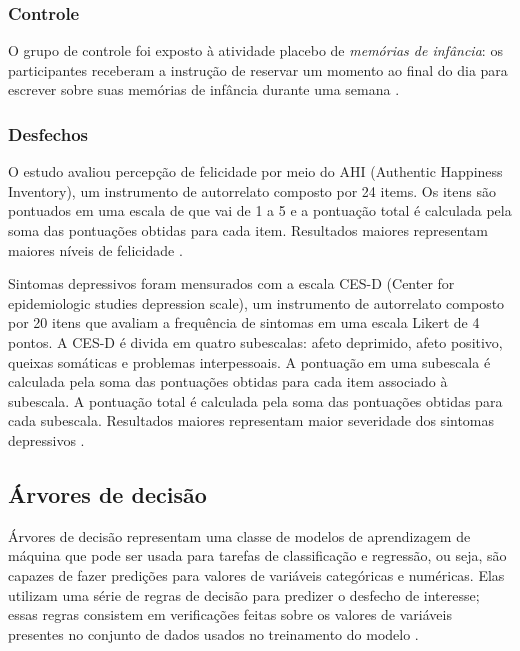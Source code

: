 \subsubsection{Controle}

O grupo de controle foi exposto à atividade placebo de \emph{memórias de infância}: os participantes receberam a instrução de reservar um momento ao
final do dia para escrever sobre suas memórias de infância durante uma semana \cite{Woodworth2017}.

\subsubsection{Desfechos}

O estudo avaliou percepção de felicidade por meio do AHI (Authentic Happiness Inventory), um instrumento de autorrelato composto por 24 items. Os itens
são pontuados em uma escala de que vai de 1 a 5 e a pontuação total é calculada pela soma das pontuações obtidas para cada item. Resultados maiores representam
maiores níveis de felicidade \cite{Park2010}.

Sintomas depressivos foram mensurados com a escala CES-D (Center for epidemiologic studies depression scale), um instrumento de autorrelato composto por 20
itens que avaliam a frequência de sintomas em uma escala Likert de 4 pontos. A CES-D é divida em quatro subescalas: afeto deprimido, afeto positivo, queixas
somáticas e problemas interpessoais. A pontuação em uma subescala é calculada pela soma das pontuações obtidas para cada item associado à subescala. A pontuação
total é calculada pela soma das pontuações obtidas para cada subescala. Resultados maiores representam maior severidade dos sintomas depressivos \cite{Radloff1977}.

\subsection{Árvores de decisão}

Árvores de decisão representam uma classe de modelos de aprendizagem de máquina que pode ser usada para tarefas de classificação e regressão, ou seja, são
capazes de fazer predições para valores de variáveis categóricas e numéricas. Elas utilizam uma série de regras de decisão para predizer o desfecho de interesse;
essas regras consistem em verificações feitas sobre os valores de variáveis presentes no conjunto de dados usados no treinamento do modelo \cite{Theobald2021, Bi2019}.

